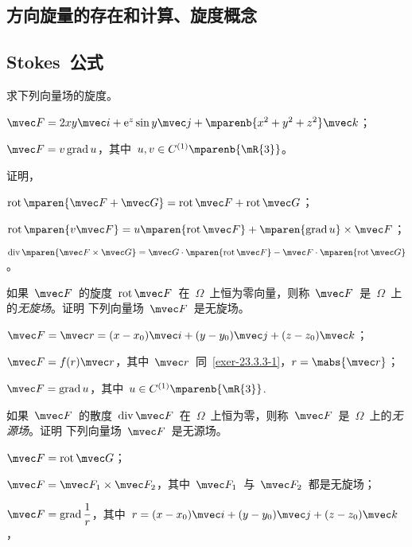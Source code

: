 \subsection{方向旋量的存在和计算、旋度概念}
\subsection{Stokes~公式}
\begin{exercise}
\item 求下列向量场的旋度。
\begin{exlistcols}
  \item $\mvec F=2xy\mvec i+\me^z\sin y\mvec j+\mparenb{x^2+y^2+z^2}\mvec k$；
  \item $\mvec F=v\grad u$，其中~$u,v\in C^{(1)}\mparenb{\mR{3}}$。
\end{exlistcols}
\item 证明，
\begin{exlistcols}
  \item $\mrot\mparen{\mvec F+\mvec G}=\mrot\mvec F+\mrot\mvec G$；
  \item $\mrot\mparen{v\mvec F}=u\mparen{\mrot\mvec F}+\mparen{\grad u}\times\mvec F$；
  \item $\mdiv\mparen{\mvec F\times\mvec G}=\mvec G\cdot\mparen{\mrot\mvec F}-\mvec F\cdot\mparen{\mrot\mvec G}$。
\end{exlistcols}
\item 如果~$\mvec F$~的旋度~$\mrot\mvec F$~在~$\Omega$~上恒为零向量，则称~$\mvec F$~是~$\Omega$~上的\emph{无旋场}。证明
下列向量场~$\mvec F$~是无旋场。
\begin{exlistcols}
  \item\label{exer-23.3.3-1}$\mvec F=\mvec r=(x-x_0)\mvec i+(y-y_0)\mvec j+(z-z_0)\mvec k$；
  \item $\mvec F=f(r)\mvec r$，其中~$\mvec r$~同~\ref{exer-23.3.3-1}，$r=\mabs{\mvec r}$；
  \item $\mvec F=\grad u$，其中~$u\in C^{(1)}\mparenb{\mR{3}}$.
\end{exlistcols}
\item 如果~$\mvec F$~的散度~$\mdiv\mvec F$~在~$\Omega$~上恒为零，则称~$\mvec F$~是~$\Omega$~上的\emph{无源场}。证明
下列向量场~$\mvec F$~是无源场。
\begin{exlistcols}
  \item $\mvec F=\mrot\mvec G$；
  \item $\mvec F=\mvec F_1\times\mvec F_2$，其中~$\mvec F_1$~与~$\mvec F_2$~都是无旋场；
  \item\label{exer-23.3.4-3}$\mvec F=\grad\dfrac1r$，其中~$r=(x-x_0)\mvec i+(y-y_0)\mvec j+(z-z_0)\mvec k$，%

\end{exlistcols}
\end{exercise}
